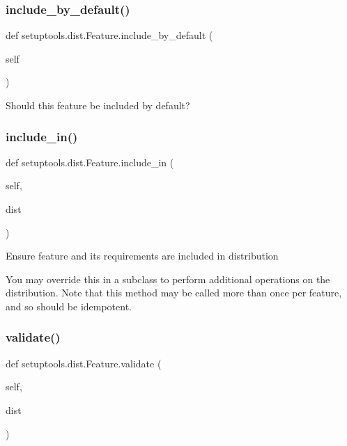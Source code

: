 \subsubsection{\texorpdfstring{include\+\_\+by\+\_\+default()}{include\_by\_default()}}
{\footnotesize\ttfamily def setuptools.\+dist.\+Feature.\+include\+\_\+by\+\_\+default (\begin{DoxyParamCaption}\item[{}]{self }\end{DoxyParamCaption})}

\begin{DoxyVerb}Should this feature be included by default?\end{DoxyVerb}
 \mbox{\label{classsetuptools_1_1dist_1_1_feature_a02c6d97eea9aa58d36a60fa33dac0b97}} 
\subsubsection{\texorpdfstring{include\+\_\+in()}{include\_in()}}
{\footnotesize\ttfamily def setuptools.\+dist.\+Feature.\+include\+\_\+in (\begin{DoxyParamCaption}\item[{}]{self,  }\item[{}]{dist }\end{DoxyParamCaption})}

\begin{DoxyVerb}Ensure feature and its requirements are included in distribution

You may override this in a subclass to perform additional operations on
the distribution.  Note that this method may be called more than once
per feature, and so should be idempotent.\end{DoxyVerb}
 \mbox{\label{classsetuptools_1_1dist_1_1_feature_a4d60dcf37f70c14ee94f92a3dd1a9e2c}} 
\subsubsection{\texorpdfstring{validate()}{validate()}}
{\footnotesize\ttfamily def setuptools.\+dist.\+Feature.\+validate (\begin{DoxyParamCaption}\item[{}]{self,  }\item[{}]{dist }\end{DoxyParamCaption})}

